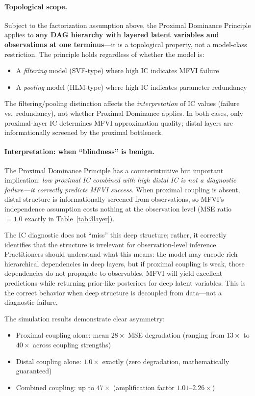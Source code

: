 \documentclass[10pt]{article} %
\theoremstyle{plain}
\theoremstyle{definition}
\begin{document}
\paragraph{Topological scope.} Subject to the factorization assumption above, the Proximal Dominance Principle applies to \textbf{any DAG hierarchy with layered latent variables and observations at one terminus}---it is a topological property, not a model-class restriction. The principle holds regardless of whether the model is:
\begin{itemize}
    \item A \emph{filtering} model (SVF-type) where high IC indicates MFVI failure
    \item A \emph{pooling} model (HLM-type) where high IC indicates parameter redundancy
\end{itemize}
The filtering/pooling distinction affects the \emph{interpretation} of IC values (failure vs.\ redundancy), not whether Proximal Dominance applies. In both cases, only proximal-layer IC determines MFVI approximation quality; distal layers are informationally screened by the proximal bottleneck.

\paragraph{Interpretation: when ``blindness'' is benign.} The Proximal Dominance Principle has a counterintuitive but important implication: \emph{low proximal IC combined with high distal IC is not a diagnostic failure---it correctly predicts MFVI success}. When proximal coupling is absent, distal structure is informationally screened from observations, so MFVI's independence assumption costs nothing at the observation level (MSE ratio $= 1.0$ exactly in Table~\ref{tab:3layer}). 

The IC diagnostic does not ``miss'' this deep structure; rather, it correctly identifies that the structure is irrelevant for observation-level inference. Practitioners should understand what this means: the model may encode rich hierarchical dependencies in deep layers, but if proximal coupling is weak, those dependencies do not propagate to observables. MFVI will yield excellent predictions while returning prior-like posteriors for deep latent variables. This is the correct behavior when deep structure is decoupled from data---not a diagnostic failure.

The simulation results demonstrate clear asymmetry:
\begin{itemize}
    \item Proximal coupling alone: mean $28\times$ MSE degradation (ranging from $13\times$ to $40\times$ across coupling strengths)
    \item Distal coupling alone: $1.0\times$ exactly (zero degradation, mathematically guaranteed)
    \item Combined coupling: up to $47\times$ (amplification factor $1.01$--$2.26\times$)
\end{itemize}
\end{document}
